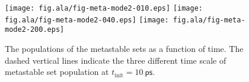 \documentclass[aip,jcp,a4paper,preprint,onecolumn]{revtex4-1}
\begin{document}
\begin{figure}
  \centering
  \texttt{[image: fig.ala/fig-meta-mode2-010.eps]}
  \texttt{[image: fig.ala/fig-meta-mode2-040.eps]}
  \texttt{[image: fig.ala/fig-meta-mode2-200.eps]}
  \caption{The populations of the metastable sets as a function of time.
    The dashed vertical lines indicate the three different time scale of
  metastable set population at $t_{\textrm{init}} = 10~\textsf{ps}$.}
  \label{fig:tmp5}
\end{figure}






\end{document}
